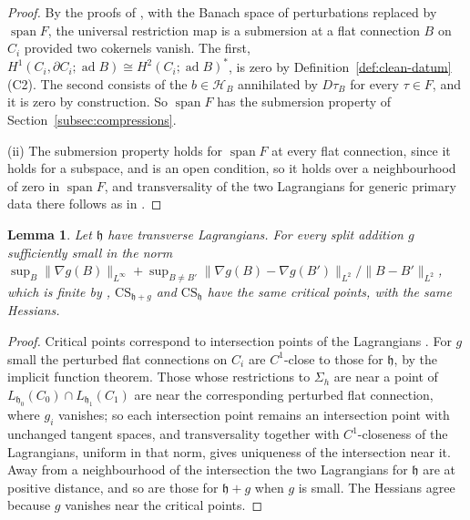 \documentclass[11pt]{amsart}
\newtheorem{lemma}[theorem]{Lemma}
\theoremstyle{definition}
\theoremstyle{remark}
\theoremstyle{plain}
\numberwithin{equation}{section}
\newcommand{\ad}{\operatorname{ad}}
\begin{document}
\begin{proof}
By the proofs of \cite[Propositions~6.5 and~6.7]{DFL}, with the Banach space of perturbations
replaced by $\operatorname{span}F$, the universal restriction map is a submersion at a flat
connection $B$ on $C_i$ provided two cokernels vanish. The first,
$H^1(C_i,\partial C_i;\ad B)\cong H^2(C_i;\ad B)^*$, is zero by
Definition~\ref{def:clean-datum}(C2). The second consists of the $b\in\mathcal H_B$ annihilated by
$D\tau_B$ for every $\tau\in F$, and it is zero by construction. So $\operatorname{span}F$ has the submersion property of
Section~\ref{subsec:compressions}.

(ii) The submersion property holds for $\operatorname{span}F$ at every flat connection, since it
holds for a subspace, and is an open condition, so it holds over a neighbourhood of zero in
$\operatorname{span}F$, and
transversality of the two Lagrangians for generic primary data there follows as in
\cite[proof of Lemma~2.56, p.~78]{DFL}.
\end{proof}

\begin{lemma}\label{lem:app-critical}
Let $\mathfrak h$ have transverse Lagrangians. For every split addition $g$ sufficiently small
in the norm
$\sup_B\|\nabla g(B)\|_{L^\infty}+\sup_{B\ne B'}\|\nabla g(B)-\nabla g(B')\|_{L^2}/\|B-B'\|_{L^2}$,
which is finite by \cite[Proposition~6.1]{DFL},
$\mathrm{CS}_{\mathfrak h+g}$ and $\mathrm{CS}_{\mathfrak h}$ have the same critical points, with
the same Hessians.
\end{lemma}

\begin{proof}
Critical points correspond to intersection points of the Lagrangians
\cite[Lemmas~2.45 and~2.47]{DFL}. For $g$ small the perturbed flat connections on $C_i$ are
$C^1$-close to those for $\mathfrak h$, by the implicit function theorem. Those whose restrictions
to $\Sigma_h$ are near a point of $L_{\mathfrak h_0}(C_0)\cap L_{\mathfrak h_1}(C_1)$ are near the
corresponding perturbed flat connection, where $g_i$ vanishes; so each intersection point
remains an intersection point with unchanged tangent spaces, and transversality together with
$C^1$-closeness of the Lagrangians, uniform in that norm, gives uniqueness of the intersection
near it. Away from a neighbourhood of the intersection the two Lagrangians
for $\mathfrak h$ are at positive distance, and so are those for $\mathfrak h+g$ when $g$ is
small. The Hessians agree because $g$ vanishes near the critical points.
\end{proof}
\end{document}
